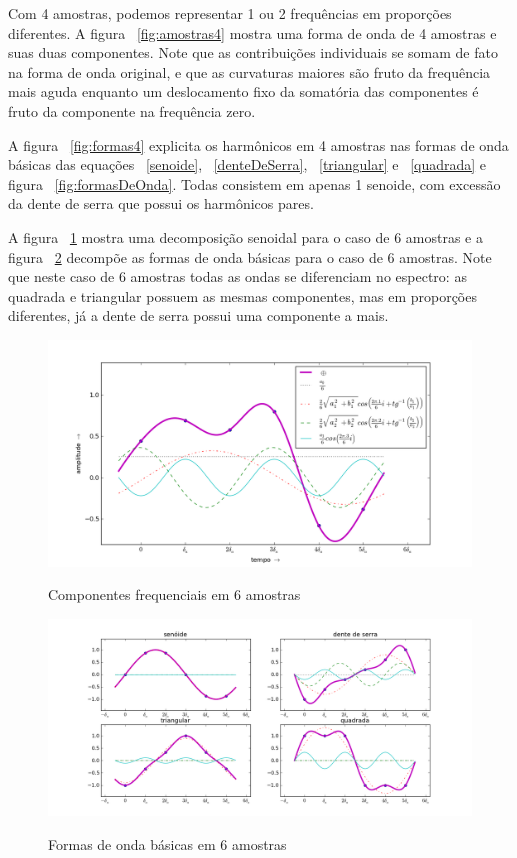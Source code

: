 Com 4 amostras, podemos representar 1 ou 2 frequências em proporções diferentes. A figura ~\ref{fig:amostras4} mostra uma 
forma de onda de 4 amostras e suas duas componentes. 
Note que as contribuições individuais se somam de fato na forma de onda 
original, e que as curvaturas maiores são fruto da frequência mais aguda
enquanto um deslocamento fixo da somatória das componentes é fruto
da componente na frequência zero.

A figura ~\ref{fig:formas4} explicita os harmônicos em 4 amostras nas formas de onda básicas das equações ~\ref{senoide}, ~\ref{denteDeSerra}, ~\ref{triangular} e ~\ref{quadrada} e figura ~\ref{fig:formasDeOnda}. Todas consistem em apenas 1 senoide, com excessão da dente de serra que possui os harmônicos pares.


A figura ~\ref{fig:amostras6} mostra uma decomposição senoidal para o caso de 6 amostras e a figura ~\ref{fig:formas6} decompõe as formas de onda básicas para o caso de 6 amostras.
 Note que neste caso de 6 amostras todas as ondas se diferenciam no espectro: as quadrada e triangular possuem as mesmas componentes, mas em proporções diferentes, já a dente de serra possui uma componente a mais.

\begin{figure}[h!]
    \centering
    \caption{Componentes frequenciais em 6 amostras}
        \includegraphics[width=\textwidth]{figuras/amostras6}
        \label{fig:amostras6}
\end{figure}

\begin{figure}[h!]
    \centering
    \caption{Formas de onda básicas em 6 amostras}
        \includegraphics[width=\textwidth]{figuras/amostras6formas___}
        \label{fig:formas6}
\end{figure}

